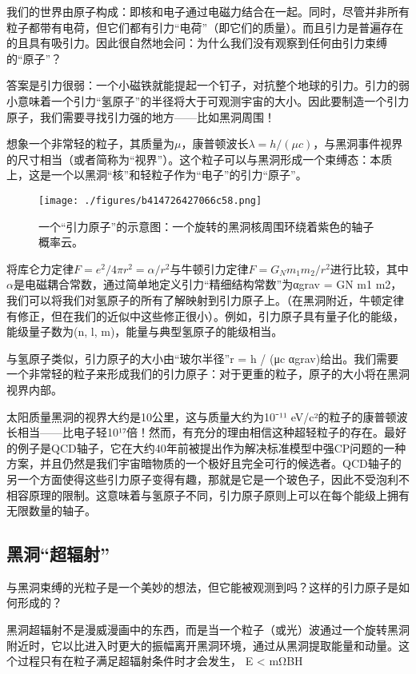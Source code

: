 
我们的世界由原子构成：即核和电子通过电磁力结合在一起。同时，尽管并非所有粒子都带有电荷，但它们都有引力“电荷”（即它们的质量）。而且引力是普遍存在的且具有吸引力。因此很自然地会问：为什么我们没有观察到任何由引力束缚的“原子”？

答案是引力很弱：一个小磁铁就能提起一个钉子，对抗整个地球的引力。引力的弱小意味着一个引力“氢原子”的半径将大于可观测宇宙的大小。因此要制造一个引力原子，我们需要寻找引力强的地方——比如黑洞周围！

想象一个非常轻的粒子，其质量为$\mu$，康普顿波长$\lambda = h / (\mu c)$，与黑洞事件视界的尺寸相当（或者简称为“视界”）。这个粒子可以与黑洞形成一个束缚态：本质上，这是一个以黑洞“核”和轻粒子作为“电子”的引力“原子”。

\begin{figure}[ht]
\centering
\texttt{[image: ./figures/b414726427066c58.png]}
\caption{一个“引力原子”的示意图：一个旋转的黑洞核周围环绕着紫色的轴子概率云。} \label{fig_GAtom_1}
\end{figure}

将库仑力定律$F = e^2 / 4\pi r^2 = \alpha / r^2$与牛顿引力定律$F = G_N m_1 m_2 / r^2$进行比较，其中$\alpha$是电磁耦合常数，通过简单地定义引力“精细结构常数”为αgrav = GN m1 m2，我们可以将我们对氢原子的所有了解映射到引力原子上。（在黑洞附近，牛顿定律有修正，但在我们的近似中这些修正很小）。例如，引力原子具有量子化的能级，能级量子数为(n, l, m)，能量与典型氢原子的能级相当。

与氢原子类似，引力原子的大小由“玻尔半径”r = h / (μc αgrav)给出。我们需要一个非常轻的粒子来形成我们的引力原子：对于更重的粒子，原子的大小将在黑洞视界内部。

太阳质量黑洞的视界大约是10公里，这与质量大约为10⁻¹¹ eV/c²的粒子的康普顿波长相当——比电子轻10¹⁷倍！然而，有充分的理由相信这种超轻粒子的存在。最好的例子是QCD轴子，它在大约40年前被提出作为解决标准模型中强CP问题的一种方案，并且仍然是我们宇宙暗物质的一个极好且完全可行的候选者。QCD轴子的另一个方面使得这些引力原子变得有趣，那就是它是一个玻色子，因此不受泡利不相容原理的限制。这意味着与氢原子不同，引力原子原则上可以在每个能级上拥有无限数量的轴子。

\subsection{黑洞“超辐射”}

与黑洞束缚的光粒子是一个美妙的想法，但它能被观测到吗？这样的引力原子是如何形成的？

黑洞超辐射不是漫威漫画中的东西，而是当一个粒子（或光）波通过一个旋转黑洞附近时，它以比进入时更大的振幅离开黑洞环境，通过从黑洞提取能量和动量。这个过程只有在粒子满足超辐射条件时才会发生，
E < mΩBH

